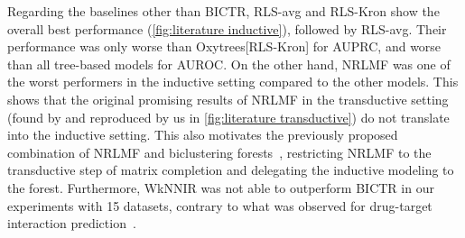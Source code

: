 \documentclass[sn-mathphys-num]{sn-jnl}%
\theoremstyle{thmstyleone}%
\theoremstyle{thmstyletwo}%
\theoremstyle{thmstylethree}%
\begin{document}
 
Regarding the baselines other than BICTR, RLS-avg and RLS-Kron show the overall best performance (\autoref{fig:literature inductive}), followed by RLS-avg. Their performance was only worse than Oxytrees[RLS-Kron] for AUPRC, and worse than all tree-based models for AUROC.
On the other hand, NRLMF was one of the worst performers in the inductive setting compared to the other models. This shows that the original promising results of NRLMF in the transductive setting (found by \citet{liu_neighborhood_2016,liu_lpi-nrlmf_2017,liu_predicting_2020} and reproduced by us in \autoref{fig:literature transductive}) do not translate into the inductive setting. This also motivates the previously proposed combination of NRLMF and biclustering forests~\cite{pliakos_drug-target_2020}, restricting NRLMF to the transductive step of matrix completion and delegating the inductive modeling to the forest.
Furthermore, WkNNIR was not able to outperform BICTR in our experiments with 15 datasets, contrary to what was observed for drug-target interaction prediction~\cite{liu_drug-target_2022}.

\end{document}

